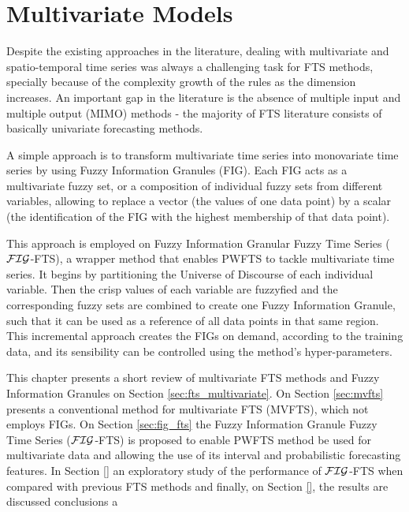
\chapter{Multivariate Models}
\label{chap:multivariate}

Despite the existing approaches in the literature, dealing with multivariate and spatio-temporal time series was always a challenging task for FTS methods, specially because of the complexity growth of the rules as the dimension increases. An important gap in the literature is the absence of multiple input and multiple output (MIMO) methods - the majority of FTS literature consists of basically univariate forecasting methods.  

A simple approach is to transform multivariate time series into monovariate time series by using Fuzzy Information Granules (FIG). Each FIG acts as a multivariate fuzzy set, or a composition of individual fuzzy sets from different variables, allowing to replace a vector (the values of one data point) by a scalar (the identification of the FIG with the highest membership of that data point).

This approach is employed on Fuzzy Information Granular Fuzzy Time Series ($\mathcal{FIG}$-FTS), a wrapper method that enables PWFTS to tackle multivariate time series. It begins by partitioning the Universe of Discourse of each individual variable. Then the crisp values of each variable are fuzzyfied and the corresponding fuzzy sets are combined to create one Fuzzy Information Granule, such that it can be used as a reference of all data points in that same region. This incremental approach creates the FIGs on demand, according to the training data, and its sensibility can be controlled using the method's hyper-parameters. 

This chapter presents a short review of multivariate FTS methods and Fuzzy Information Granules on Section \ref{sec:fts_multivariate}. On Section \ref{sec:mvfts} presents a conventional method for multivariate FTS (MVFTS), which not employs FIGs. On Section \ref{sec:fig_fts} the Fuzzy Information Granule Fuzzy Time Series ($\mathcal{FIG}$-FTS) is proposed to enable PWFTS method be used for multivariate data and allowing the use of its interval and probabilistic forecasting features. In Section \ref{} an exploratory study of the performance of $\mathcal{FIG}$-FTS when compared with previous FTS methods and finally, on Section \ref{}, the results are discussed conclusions a 


